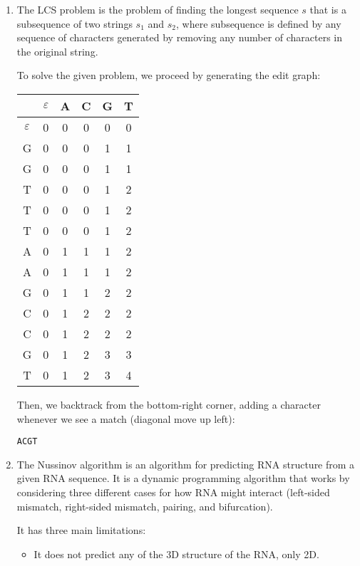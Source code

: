 


\begin{enumerate}[label=(\alph*)]
  \item

    The LCS problem is the problem of finding the longest sequence $s$ that is a subsequence of two strings $s_1$ and $s_2$, where subsequence is defined by any sequence of characters generated by removing any number of characters in the original string.

    To solve the given problem, we proceed by generating the edit graph:

    \begin{tabular}{c|c|c|c|c|c}
      &$\varepsilon$&A&C&G&T\\
      \hline
      $\varepsilon$&0&0&0&0&0\\
      \hline
      G&0&0&0&1&1\\
      \hline
      G&0&0&0&1&1\\
      \hline
      T&0&0&0&1&2\\
      \hline
      T&0&0&0&1&2\\
      \hline
      T&0&0&0&1&2\\
      \hline
      A&0&1&1&1&2\\
      \hline
      A&0&1&1&1&2\\
      \hline
      G&0&1&1&2&2\\
      \hline
      C&0&1&2&2&2\\
      \hline
      C&0&1&2&2&2\\
      \hline
      G&0&1&2&3&3\\
      \hline
      T&0&1&2&3&4\\
        
    \end{tabular}

    Then, we backtrack from the bottom-right corner, adding a character whenever we see a match (diagonal move up left):

    \texttt{ACGT}

  \item
    The Nussinov algorithm is an algorithm for predicting RNA structure from a given RNA sequence. It is a dynamic programming algorithm that works by considering three different cases for how RNA might interact (left-sided mismatch, right-sided mismatch, pairing, and bifurcation).

    It has three main limitations:

    \begin{itemize}
      \item
        It does not predict any of the 3D structure of the RNA, only 2D.


\end{itemize}
\end{enumerate}
